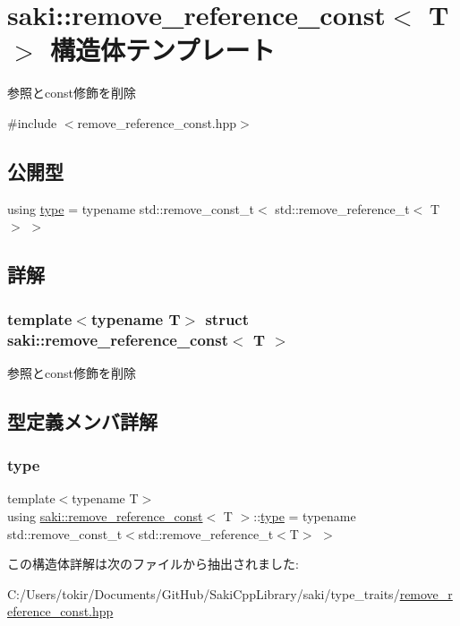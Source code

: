 \hypertarget{structsaki_1_1remove__reference__const}{}\section{saki\+:\+:remove\+\_\+reference\+\_\+const$<$ T $>$ 構造体テンプレート}
\label{structsaki_1_1remove__reference__const}


参照とconst修飾を削除  




{\ttfamily \#include $<$remove\+\_\+reference\+\_\+const.\+hpp$>$}

\subsection*{公開型}
\begin{DoxyCompactItemize}
\item 
using \mbox{\hyperlink{structsaki_1_1remove__reference__const_ac1734aa19be1e083bd9bd22c05f930e3}{type}} = typename std\+::remove\+\_\+const\+\_\+t$<$ std\+::remove\+\_\+reference\+\_\+t$<$ T $>$ $>$
\end{DoxyCompactItemize}


\subsection{詳解}
\subsubsection*{template$<$typename T$>$\newline
struct saki\+::remove\+\_\+reference\+\_\+const$<$ T $>$}

参照とconst修飾を削除 

\subsection{型定義メンバ詳解}
\mbox{\label{structsaki_1_1remove__reference__const_ac1734aa19be1e083bd9bd22c05f930e3}} 
\subsubsection{\texorpdfstring{type}{type}}
{\footnotesize\ttfamily template$<$typename T$>$ \\
using \mbox{\hyperlink{structsaki_1_1remove__reference__const}{saki\+::remove\+\_\+reference\+\_\+const}}$<$ T $>$\+::\mbox{\hyperlink{structsaki_1_1remove__reference__const_ac1734aa19be1e083bd9bd22c05f930e3}{type}} =  typename std\+::remove\+\_\+const\+\_\+t$<$std\+::remove\+\_\+reference\+\_\+t$<$T$>$ $>$}



この構造体詳解は次のファイルから抽出されました\+:\begin{DoxyCompactItemize}
\item 
C\+:/\+Users/tokir/\+Documents/\+Git\+Hub/\+Saki\+Cpp\+Library/saki/type\+\_\+traits/\mbox{\hyperlink{remove__reference__const_8hpp}{remove\+\_\+reference\+\_\+const.\+hpp}}\end{DoxyCompactItemize}

